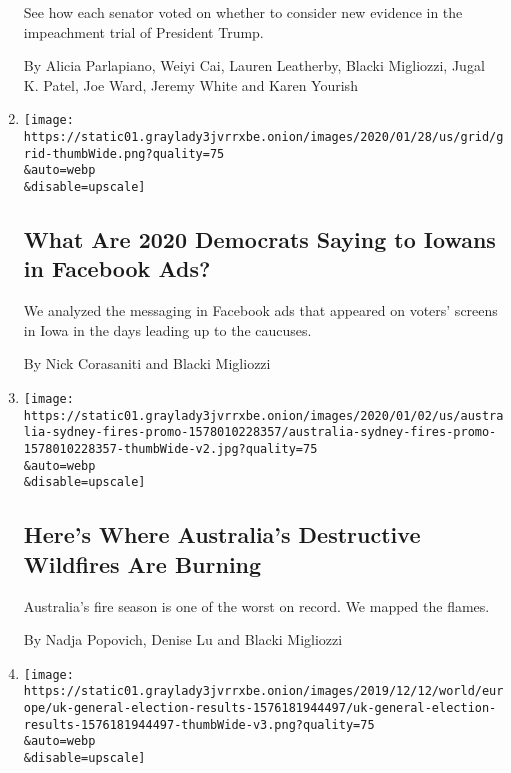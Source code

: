 \begin{enumerate}
  See how each senator voted on whether to consider new evidence in the
  impeachment trial of President Trump.

  By Alicia Parlapiano, Weiyi Cai, Lauren Leatherby, Blacki Migliozzi,
  Jugal K. Patel, Joe Ward, Jeremy White and Karen Yourish
\item
  \href{/interactive/2020/01/29/us/politics/iowa-facebook-political-ads.html}{}

  \texttt{[image: https://static01.graylady3jvrrxbe.onion/images/2020/01/28/us/grid/grid-thumbWide.png?quality=75\\\&auto=webp\\\&disable=upscale]}

  \hypertarget{what-are-2020-democrats-saying-to-iowans-in-facebook-ads}{%
  \subsection{What Are 2020 Democrats Saying to Iowans in Facebook
  Ads?}\label{what-are-2020-democrats-saying-to-iowans-in-facebook-ads}}

  We analyzed the messaging in Facebook ads that appeared on voters'
  screens in Iowa in the days leading up to the caucuses.

  By Nick Corasaniti and Blacki Migliozzi
\item
  \href{/interactive/2020/01/02/climate/australia-fires-map.html}{}

  \texttt{[image: https://static01.graylady3jvrrxbe.onion/images/2020/01/02/us/australia-sydney-fires-promo-1578010228357/australia-sydney-fires-promo-1578010228357-thumbWide-v2.jpg?quality=75\\\&auto=webp\\\&disable=upscale]}

  \hypertarget{heres-where-australias-destructive-wildfires-are-burning}{%
  \subsection{Here's Where Australia's Destructive Wildfires Are
  Burning}\label{heres-where-australias-destructive-wildfires-are-burning}}

  Australia's fire season is one of the worst on record. We mapped the
  flames.

  By Nadja Popovich, Denise Lu and Blacki Migliozzi
\item
  \href{/interactive/2019/12/13/world/europe/uk-general-election-results.html}{}

  \texttt{[image: https://static01.graylady3jvrrxbe.onion/images/2019/12/12/world/europe/uk-general-election-results-1576181944497/uk-general-election-results-1576181944497-thumbWide-v3.png?quality=75\\\&auto=webp\\\&disable=upscale]}


\end{enumerate}
